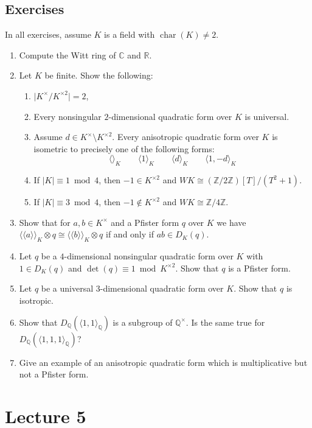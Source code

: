 \documentclass[12pt, leqno, british]{amsart}
\theoremstyle{definition}
\theoremstyle{plain}
\theoremstyle{remark}
\newcommand{\mbb}{\mathbb}
\newcommand{\cc}{\mathbb C}
\newcommand{\rr}{\mathbb R}
\newcommand{\qq}{\mbb Q}
\newcommand{\zz}{\mbb Z}
\DeclareMathOperator{\charac}{char}
\newcommand{\llangle}{\langle\!\langle}
\newcommand{\rrangle}{\rangle\!\rangle}
\begin{document}
\subsection{Exercises}
In all exercises, assume $K$ is a field with $\charac(K) \neq 2$.
\begin{enumerate}
\item Compute the Witt ring of $\cc$ and $\rr$.
\item Let $K$ be finite.
Show the following:
\begin{enumerate}
\item $\lvert K^\times / K^{\times 2} \rvert = 2$,
\item Every nonsingular $2$-dimensional quadratic form over $K$ is universal.
\item Assume $d \in K^\times \setminus K^{\times 2}$.
Every anisotropic quadratic form over $K$ is isometric to precisely one of the following forms:
\begin{displaymath}
\langle \rangle_K \qquad \langle 1 \rangle_K \qquad \langle d \rangle_K \qquad \langle 1, -d \rangle_K
\end{displaymath}
\item If $\lvert K \rvert \equiv 1 \bmod 4$, then $-1 \in K^{\times 2}$ and $WK \cong (\zz/2\zz)[T]/(T^2 + 1)$.
\item If $\lvert K \rvert \equiv 3 \bmod 4$, then $-1 \not\in K^{\times 2}$ and $WK \cong \zz/4\zz$.
\end{enumerate}
\item
Show that for $a, b \in K^\times$ and a Pfister form $q$ over $K$ we have $\llangle a \rrangle_K \otimes q \cong \llangle b \rrangle_K \otimes q$ if and only if $ab \in D_K(q)$.
\item Let $q$ be a $4$-dimensional nonsingular quadratic form over $K$ with $1 \in D_K(q)$ and $\det(q) \equiv 1 \bmod K^{\times 2}$.
Show that $q$ is a Pfister form.
\item Let $q$ be a universal $3$-dimensional quadratic form over $K$.
Show that $q$ is isotropic.
\item Show that $D_\qq(\langle 1, 1 \rangle_\qq)$ is a subgroup of $\qq^\times$.
Is the same true for $D_\qq(\langle 1, 1, 1 \rangle_\qq)$?
\item Give an example of an anisotropic quadratic form which is multiplicative but not a Pfister form.
\end{enumerate}

\section{Lecture 5}
\end{document}
